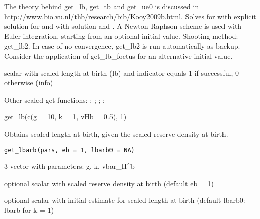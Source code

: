 \documentclass[a4paper]{book}
\begin{document}
%
\begin{Details}\relax
The theory behind get\_lb, get\_tb and get\_ue0 is discussed in http://www.bio.vu.nl/thb/research/bib/Kooy2009b.html.
Solves   for  with explicit solution for 
and 
with solution 
and .
A Newton Raphson scheme is used with Euler integration, starting from an optional initial value.
Shooting method: get\_lb2.
In case of no convergence, get\_lb2 is run automatically as backup.
Consider the application of get\_lb\_foetus for an alternative initial value.
\end{Details}
%
\begin{Value}
scalar with scaled length at birth (lb) and indicator equals 1 if successful, 0 otherwise (info)
\end{Value}
%
\begin{SeeAlso}\relax
Other scaled get functions: ;
; ;
;
\end{SeeAlso}
%
\begin{Examples}
\begin{ExampleCode}
get_lb(c(g = 10, k = 1, vHb = 0.5), 1)
\end{ExampleCode}
\end{Examples}
%
\begin{Description}\relax
Obtains scaled length at birth, given the scaled reserve density at birth.
\end{Description}
%
\begin{Usage}
\begin{verbatim}
get_lbarb(pars, eb = 1, lbarb0 = NA)
\end{verbatim}
\end{Usage}
%
\begin{Arguments}
\begin{ldescription}
\item[\code{pars}] 3-vector with parameters: g, k, vbar\_H\textasciicircum{}b

\item[\code{eb}] optional scalar with scaled reserve density at birth (default eb = 1)

\item[\code{lbarb0}] optional scalar with initial estimate for scaled length at birth (default lbarb0: lbarb for k = 1)
\end{ldescription}
\end{Arguments}
\end{document}
